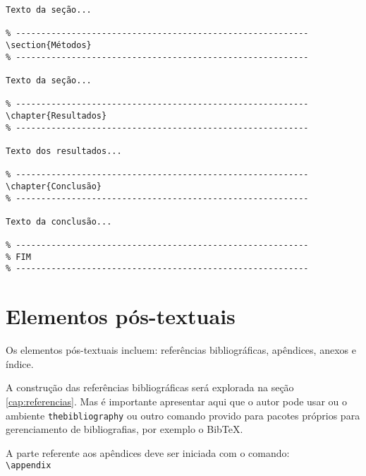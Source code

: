 \documentclass[a4paper,12pt,oneside,onecolumn]{article}
\newcommand{\comando}[1]{\texttt{\textbackslash #1}}
\newcommand{\BibTeX}{{{Bib}}\TeX}
\begin{document}
\begin{verbatim}
Texto da seção...

% ----------------------------------------------------------
\section{Métodos}
% ----------------------------------------------------------

Texto da seção...

% ----------------------------------------------------------
\chapter{Resultados}
% ----------------------------------------------------------

Texto dos resultados...

% ----------------------------------------------------------
\chapter{Conclusão}
% ----------------------------------------------------------

Texto da conclusão...

% ----------------------------------------------------------
% FIM
% ----------------------------------------------------------
\end{verbatim}

\section{Elementos pós-textuais}

Os elementos pós-textuais incluem: referências bibliográficas, apêndices, anexos e índice.

A construção das referências bibliográficas será explorada na seção \ref{cap:referencias}. Mas é importante apresentar aqui que o autor pode usar ou o ambiente \texttt{thebibliography} ou outro comando provido para pacotes próprios para gerenciamento de bibliografias, por exemplo o \BibTeX.

A parte referente aos apêndices deve ser iniciada com o comando:\\

\comando{appendix}\\
\end{document}
